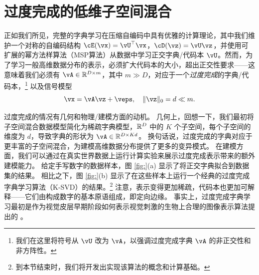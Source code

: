 \documentclass[../../book-main.tex]{subfiles}
\begin{document}
\section{过度完成的低维子空间混合}
\label{sec:dictionary_learning}
正如我们所见，完整的字典学习在压缩自编码中具有优雅的计算理论，其中我们维护一个对称的自编码结构 $\cE(\vx) = \vU^\top \vx$，$\cD(\vz) = \vU \vz$，并使用可扩展的幂方法样算法（MSP算法）从数据中学习正交字典/代码本 $\vU$。然而，为了学习一般高维数据分布的表示，必须扩大代码本的大小，超出正交性要求——这意味着我们必须有 $\vA \in \R^{D \times m}$，其中 $m \gg D$，对应于一个\textit{过度完成}的字典/代码本，\footnote{我们在这里将符号从 $\vU$ 改为 $\vA$，以强调过度完成字典 $\vA$ 的非正交性和非方阵性。} 以及信号模型
\begin{equation}\label{eq:model-DL-overcomplete}
    \vx =  \vA \vz + \veps,
    \quad
    \norm{\vz}_0 = d \ll m.
\end{equation}

过度完成的情况有几何和物理/建模方面的动机。
几何上，回想一下，我们最初将子空间混合数据模型简化为稀疏字典模型，$\mathbb{R}^D$ 中的 $K$ 个子空间，每个子空间的维度为 $d$，导致字典的形状为 $\vA \in \R^{D \times Kd}$。
换句话说，过度完成的字典对应于更丰富的子空间混合，为建模高维数据分布提供了更多的变异模式。
在建模方面，我们可以通过在真实世界数据上运行计算实验来展示过度完成表示带来的额外建模能力。
给定手写数字的数据样本，图 \ref{fig:}(a) 显示了将正交字典拟合到数据集的结果。
相比之下，图 \ref{fig:}(b) 显示了在这些样本上运行一个经典的过度完成字典学习算法（K-SVD）的结果。\footnote{到本节结束时，我们将开发出实现该算法的概念和计算基础。}
注意，表示变得更加稀疏，代码本也更加可解释——它们由构成数字的基本原语组成，即定向边缘。
事实上，过度完成字典学习最初是作为视觉皮层早期阶段如何表示视觉刺激的生物上合理的图像表示算法提出的 \cite{Olshausen1996-ap,Olshausen1997-yv}。
\end{document}
